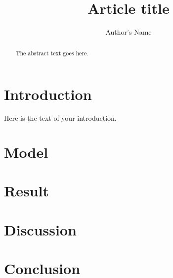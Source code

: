 \documentclass{article}
\begin{document}
\title{Article title}
\author{Author's Name}

\maketitle

\begin{abstract}
The abstract text goes here.
\end{abstract}

\section{Introduction}
Here is the text of your introduction.

\section{Model}

\section{Result}
\section{Discussion}


\section{Conclusion}
\end{document}
